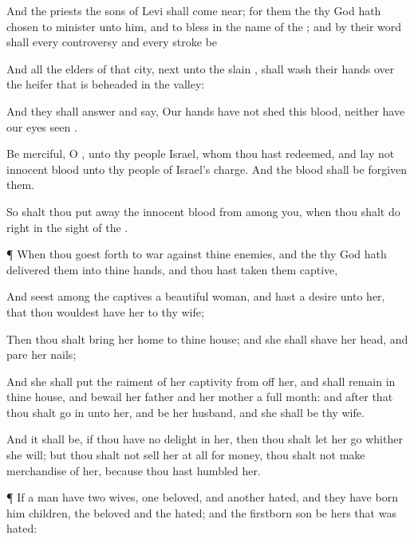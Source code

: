 {And the
priests the
sons of
Levi shall come
near; for them the
{} thy
God hath
chosen to
minister unto him, and to
bless in the
name of the
{}; and by their
word shall every
controversy and every
stroke be
{}

And all the
elders of that
city,
{}
next unto the
slain
{}, shall
wash their
hands over the
heifer that is
beheaded in the
valley:

And they shall
answer and
say, Our
hands have not
shed this
blood, neither have our
eyes
seen
{}.

Be
merciful, O
{}, unto thy
people
Israel, whom thou hast
redeemed, and
lay not
innocent
blood unto thy
people of
Israel’s
charge. And the
blood shall be
forgiven them.

So shalt thou put
away the
{}
innocent
blood from
among you, when thou shalt
do
{}
right in the
sight of the
{}.


\par }{\PP {}¶ When thou goest
forth to
war against thine
enemies, and the
{} thy
God hath
delivered them into thine
hands, and thou hast
taken them
captive,

And
seest among the
captives a
beautiful
woman, and hast a
desire unto her, that thou wouldest have
her to thy
wife;

Then thou shalt
bring her
home to thine
house; and she shall
shave her
head, and
pare her
nails;

And she shall
put the
raiment of her
captivity from off her, and shall
remain in thine
house, and
bewail her
father and her
mother a
full
month: and
after that thou shalt
go in unto her, and be her
husband, and she shall be thy
wife.

And it shall be, if thou have no
delight in her, then thou shalt let her
go whither she
will; but thou shalt not
sell her at
all for
money, thou shalt not make
merchandise of her,
because thou hast
humbled her.


\par }{\PP {}¶ If a
man have
two
wives,
one
beloved, and
another
hated, and they have
born him
children,
{} the
beloved and the
hated; and
{} the
firstborn
son be hers that was
hated:

}
